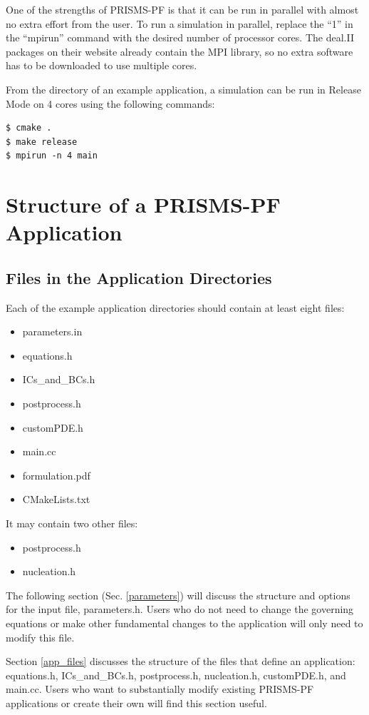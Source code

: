 \documentclass[10pt]{article} %
\begin{document}
One of the strengths of PRISMS-PF is that it can be run in parallel with almost no extra effort from the user. To run a simulation in parallel, replace the ``1'' in the ``mpirun'' command with the desired number of processor cores. The deal.II packages on their website already contain the MPI library, so no extra software has to be downloaded to use multiple cores.

From the directory of an example application, a simulation can be run in Release Mode on 4 cores using the following commands:
\begin{lstlisting}
$ cmake . 
$ make release
$ mpirun -n 4 main 
\end{lstlisting}

\section{Structure of a PRISMS-PF Application}
\subsection{Files in the Application Directories}
Each of the example application directories should contain at least eight files:
\begin{itemize}
\item parameters.in
\item equations.h
\item ICs\_and\_BCs.h
\item postprocess.h
\item customPDE.h
\item main.cc
\item formulation.pdf
\item CMakeLists.txt
\end{itemize}

It may contain two other files:
\begin{itemize}
\item postprocess.h
\item nucleation.h
\end{itemize}

The following section (Sec. \ref{parameters}) will discuss the structure and options for the input file, parameters.h. Users who do not need to change the governing equations or make other fundamental changes to the application will only need to modify this file.

Section \ref{app_files} discusses the structure of the files that define an application: equations.h, ICs\_and\_BCs.h, postprocess.h, nucleation.h, customPDE.h, and main.cc. Users who want to substantially modify existing PRISMS-PF applications or create their own will find this section useful.
\end{document}
